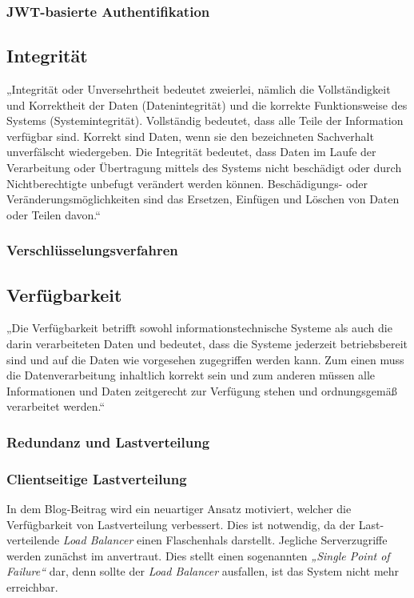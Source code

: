 \subsubsection{JWT-basierte Authentifikation}


\subsection{Integrität}
\label{subsec:integrität}
„Integrität oder Unversehrtheit bedeutet zweierlei, nämlich die Vollständigkeit und Korrektheit der Daten (Datenintegrität) und die korrekte Funktionsweise des Systems (Systemintegrität). Vollständig bedeutet, dass alle Teile der Information verfügbar sind. Korrekt sind Daten, wenn sie den bezeichneten Sachverhalt unverfälscht wiedergeben. Die Integrität bedeutet, dass Daten im Laufe der Verarbeitung oder Übertragung mittels des Systems nicht beschädigt oder durch Nichtberechtigte unbefugt verändert werden können. Beschädigungs- oder Veränderungsmöglichkeiten sind das Ersetzen, Einfügen und Löschen von Daten oder Teilen davon.“ \cite{Bedner+10}

\subsubsection{Verschlüsselungsverfahren}


\subsection{Verfügbarkeit}
\label{subsec:verfügbarkeit}
„Die Verfügbarkeit betrifft sowohl informationstechnische Systeme als auch die darin verarbeiteten Daten und bedeutet, dass die Systeme jederzeit betriebsbereit sind und auf die Daten wie vorgesehen zugegriffen werden kann. Zum einen muss die Datenverarbeitung inhaltlich korrekt sein und zum anderen müssen alle Informationen und Daten zeitgerecht zur Verfügung stehen und ordnungsgemäß verarbeitet werden.“ \cite{Bedner+10}

\subsubsection{Redundanz und Lastverteilung}

\subsubsection{Clientseitige Lastverteilung}

In dem Blog-Beitrag \cite{Li15} wird ein neuartiger Ansatz motiviert, welcher die Verfügbarkeit von Lastverteilung verbessert. Dies ist notwendig, da der Last-verteilende \textit{Load Balancer} einen Flaschenhals darstellt. Jegliche Serverzugriffe werden zunächst im anvertraut. Dies stellt einen sogenannten \textit{„Single Point of Failure“} dar, denn sollte der \textit{Load Balancer} ausfallen, ist das System nicht mehr erreichbar.

